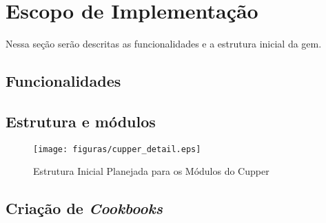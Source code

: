 \section{Escopo de Implementação}
\label{sec:escopo}
Nessa seção serão descritas as funcionalidades e a estrutura inicial da gem.

\subsection{Funcionalidades}



\subsection{Estrutura e módulos}

\begin{figure}[H]
  \centering
  \texttt{[image: figuras/cupper\_detail.eps]}
  \caption{Estrutura Inicial Planejada para os Módulos do Cupper}
  \label{fig:cupper-detail}
\end{figure}



\subsection{Criação de \textit{Cookbooks}}
